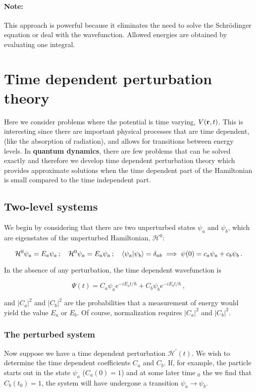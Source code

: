 \documentclass[12pt, titlepage]{article}
\begin{document}
\begin{mdframed}
\paragraph*{Note:}
This approach is powerful because it eliminates the need to solve the Schrödinger equation or deal with the wavefunction. Allowed energies are obtained by evaluating one integral. 
\end{mdframed}

\section{Time dependent perturbation theory}
Here we consider problems where the potential is time varying, $V(\vb{r},t)$. This is interesting since there are important physical processes that are time dependent, (like the absorption of radiation), and allows for transitions between energy levels. In \textbf{quantum dynamics}, there are few problems that can be solved exactly and therefore we develop time dependent perturbation theory which provides approximate solutions when the time dependent part of the Hamiltonian is small compared to the time independent part.

\subsection{Two-level systems}
We begin by considering that there are two unperturbed states $\psi_a$ and $\psi_b$, which are eigenstates of the unperturbed Hamiltonian, $\mathcal{H}^0$:

\begin{equation*}
	\mathcal{H}^0\psi_a = E_a\psi_a \,; \quad \mathcal{H}^0\psi_a = E_a\psi_a \,; \quad \bra{\psi_a}\ket{\psi_b}=\delta_{ab} \implies \psi(0) = c_a\psi_a + c_b\psi_b\,.
\end{equation*}

In the absence of any perturbation, the time dependent wavefunction is

\begin{equation}
	\Psi(t) = C_a\psi_ae^{-i E_a t/\hbar} + C_b\psi_be^{-i E_b t/\hbar} \,,
\end{equation}

and $|C_a|^2$ and $|C_b|^2$ are the probabilities that a measurement of energy would yield the value $E_a$ or $E_b$. Of course, normalization requires $|C_a|^2$ and $|C_b|^2$.

\subsubsection{The perturbed system}
Now suppose we have a time dependent perturbation $\mathcal{H}^\prime(t)$. We wish to determine the time dependent coefficients $C_a$ and $C_b$. If, for example, the particle starts out in the state $\psi_a$ ($C_a(0) = 1$) and at some later time $_0$ the we find that $C_b(t_0) = 1$, the system will have undergone a transition $\psi_a \rightarrow \psi_b$.
\end{document}
